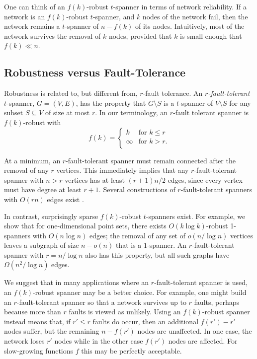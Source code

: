 \documentclass{patmorin}
\begin{document}
One can think of an $f(k)$-robust $t$-spanner in terms of network
reliability.  If a network is an $f(k)$-robust $t$-spanner, and $k$ nodes
of the network fail, then the network remains a $t$-spanner of $n-f(k)$
of its nodes.  Intuitively, most of the network survives the removal of
$k$ nodes, provided that $k$ is small enough that $f(k)\ll n$.

\subsection{Robustness versus Fault-Tolerance}

Robustness is related to, but different from, $r$-fault tolerance.
An \emph{$r$-fault-tolerant} $t$-spanner, $G=(V,E)$, has the property
that $G\setminus S$ is a $t$-spanner of $V\setminus S$ for any subset
$S\subseteq V$ of size at most $r$.  In our terminology, an $r$-fault
tolerant spanner is $f(k)$-robust with
\[
    f(k) = \begin{cases}k & \text{for $k \le r$}  \\
                   \infty & \text{for $k > r$.}  \\
   \end{cases}
\]

At a minimum, an $r$-fault-tolerant spanner must remain connected
after the removal of any $r$ vertices.  This immediately implies
that any $r$-fault-tolerant spanner with $n>r$ vertices has at least
$(r+1)n/2$ edges, since every vertex must have degree at least $r+1$.
Several constructions of $r$-fault-tolerant spanners with $O(rn)$ edges
exist \cite{cz04,lns02,l99}.

In contrast, surprisingly sparse $f(k)$-robust $t$-spanners exist.
For example, we show that for one-dimensional point sets, there exists
$O(k\log k)$-robust 1-spanners with $O(n\log n)$ edges; the removal of
any set of $o(n/\log n)$ vertices leaves a subgraph of size $n-o(n)$ that
is a $1$-spanner.  An $r$-fault-tolerant spanner with $r=n/\log n$ also
has this property, but all such graphs have $\Omega(n^2/\log n)$ edges.

We suggest that in many applications where an $r$-fault-tolerant spanner
is used, an $f(k)$-robust spanner may be a better choice.  For example,
one might build an $r$-fault-tolerant spanner so that a network survives
up to $r$ faults, perhaps because more than $r$ faults is viewed as
unlikely.  Using an $f(k)$-robust spanner instead means that, if $r'\le
r$ faults do occur, then an additional $f(r')-r'$ nodes suffer, but the
remaining $n-f(r')$ nodes are unaffected.  In one case, the network
loses $r'$ nodes while in the other case $f(r')$ nodes are affected.
For slow-growing functions $f$ this may be perfectly acceptable.
\end{document}
